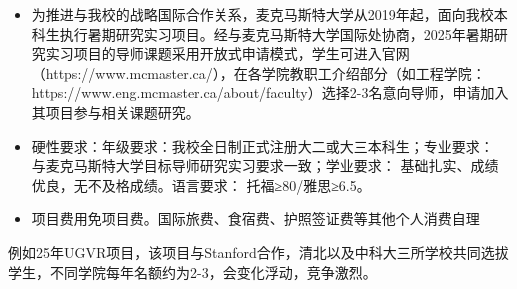 \begin{presentbox}
    \begin{itemize}
        \item 为推进与我校的战略国际合作关系，麦克马斯特大学从2019年起，面向我校本科生执行暑期研究实习项目。经与麦克马斯特大学国际处协商，2025年暑期研究实习项目的导师课题采用开放式申请模式，学生可进入官网（https://www.mcmaster.ca/），在各学院教职工介绍部分（如工程学院：https://www.eng.mcmaster.ca/about/faculty）选择2-3名意向导师，申请加入其项目参与相关课题研究。
        
        \item 硬性要求：年级要求：我校全日制正式注册大二或大三本科生；专业要求： 与麦克马斯特大学目标导师研究实习要求一致；学业要求： 基础扎实、成绩优良，无不及格成绩。语言要求： 托福≥80/雅思≥6.5。

        \item 项目费用免项目费。国际旅费、食宿费、护照签证费等其他个人消费自理
    \end{itemize}
\end{presentbox}

例如25年UGVR项目，该项目与Stanford合作，清北以及中科大三所学校共同选拔学生，不同学院每年名额约为2-3，会变化浮动，竞争激烈。

